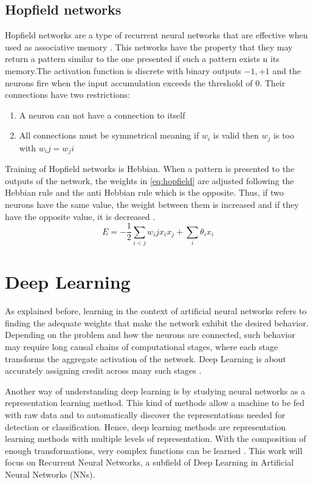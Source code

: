 \subsection{Hopfield networks}
Hopfield networks are a type of recurrent neural networks that are effective when used as associative memory \cite{hopfield1982neural}. This networks have the property that they may return a pattern similar to the one presented if such a pattern exists n its memory.The activation function is discrete with binary outputs ${-1,+1}$ and the neurons fire when the input accumulation exceeds the threshold of 0. Their connections have two restrictions:
\begin{enumerate}
\item A neuron can not have a connection to itself
\item All connections must be symmetrical meaning if $w_i$ is valid then $w_j$ is too with $w_ij=w_ji$
\end{enumerate}
Training of Hopfield networks is Hebbian. When a pattern is presented to the outputs of the network, the weights in \ref{eq:hopfield} are adjusted following the Hebbian rule and the anti Hebbian rule which is the opposite. Thus, if two neurons have the same value, the weight between them is increased and if they have the opposite value, it is decreased \cite{strom2007hebbian}.
\begin{equation}
\label{eq:hopfield}
E= -\frac{1}{2} \sum_{i<j} w_ij x_i x_j + \sum_i \theta_i x_i
\end{equation}

\section{Deep Learning}
As explained before, learning in the context of artificial neural networks refers to finding the adequate weights that make the network exhibit the desired behavior. Depending on the problem and how the neurons are connected, such behavior may require long causal chains of computational stages, where each stage transforms the aggregate activation of the network. Deep Learning is about accurately assigning credit across many such stages \cite{schmidhuber2015deep}.

Another way of understanding deep learning is by studying neural networks as a representation learning method. This kind of methods allow a machine to be fed with raw data and to automatically discover the representations needed for detection or classification. Hence, deep learning methods are representation learning methods with multiple levels of representation. With the composition of enough transformations, very complex functions can be learned \cite{lecun2015deep}. This work will focus on Recurrent Neural Networks, a subfield of Deep Learning in Artificial Neural Networks (NNs).

